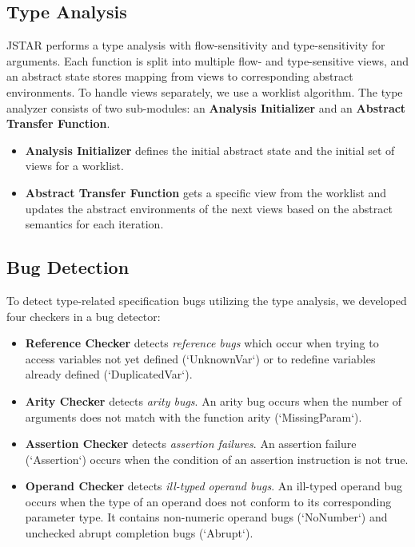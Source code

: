 \documentclass[10pt,conference]{IEEEtran}
\begin{document}
\subsection{Type Analysis}
JSTAR performs a type analysis with flow-sensitivity and type-sensitivity for
arguments.  Each function is split into multiple flow- and type-sensitive views,
and an abstract state stores mapping from views to corresponding abstract
environments.  To handle views separately, we use a worklist algorithm.  The
type analyzer consists of two sub-modules: an \textbf{Analysis Initializer} and
an \textbf{Abstract Transfer Function}.
\begin{itemize}
  \item \textbf{Analysis Initializer} defines the initial abstract state and the initial
    set of views for a worklist.
  \item \textbf{Abstract Transfer Function} gets a specific view from the worklist and
    updates the abstract environments of the next views based on the abstract
    semantics for each iteration.
\end{itemize}

\subsection{Bug Detection}
To detect type-related specification bugs utilizing the type analysis, we
developed four checkers in a bug detector:

\begin{itemize}
  \item \textbf{Reference Checker} detects \textit{reference bugs} which occur
    when trying to access variables not yet defined (`UnknownVar`) or to
    redefine variables already defined (`DuplicatedVar`).
  \item \textbf{Arity Checker} detects \textit{arity bugs}. An arity bug occurs
    when the number of arguments does not match with the function arity
    (`MissingParam`).
  \item \textbf{Assertion Checker} detects \textit{assertion failures}. An
    assertion failure (`Assertion`) occurs when the condition of an assertion
    instruction is not true.
  \item \textbf{Operand Checker} detects \textit{ill-typed operand bugs}. An
    ill-typed operand bug occurs when the type of an operand does not conform to
    its corresponding parameter type.  It contains non-numeric operand bugs
    (`NoNumber`) and unchecked abrupt completion bugs (`Abrupt`).
\end{itemize}
\end{document}
